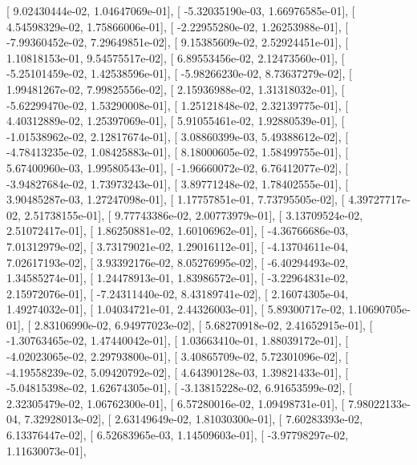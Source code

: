 \documentclass{article}
\begin{document}
       [  9.02430444e-02,   1.04647069e-01],
       [ -5.32035190e-03,   1.66976585e-01],
       [  4.54598329e-02,   1.75866006e-01],
       [ -2.22955280e-02,   1.26253988e-01],
       [ -7.99360452e-02,   7.29649851e-02],
       [  9.15385609e-02,   2.52924451e-01],
       [  1.10818153e-01,   9.54575517e-02],
       [  6.89553456e-02,   2.12473560e-01],
       [ -5.25101459e-02,   1.42538596e-01],
       [ -5.98266230e-02,   8.73637279e-02],
       [  1.99481267e-02,   7.99825556e-02],
       [  2.15936988e-02,   1.31318032e-01],
       [ -5.62299470e-02,   1.53290008e-01],
       [  1.25121848e-02,   2.32139775e-01],
       [  4.40312889e-02,   1.25397069e-01],
       [  5.91055461e-02,   1.92880539e-01],
       [ -1.01538962e-02,   2.12817674e-01],
       [  3.08860399e-03,   5.49388612e-02],
       [ -4.78413235e-02,   1.08425883e-01],
       [  8.18000605e-02,   1.58499755e-01],
       [  5.67400960e-03,   1.99580543e-01],
       [ -1.96660072e-02,   6.76412077e-02],
       [ -3.94827684e-02,   1.73973243e-01],
       [  3.89771248e-02,   1.78402555e-01],
       [  3.90485287e-03,   1.27247098e-01],
       [  1.17757851e-01,   7.73795505e-02],
       [  4.39727717e-02,   2.51738155e-01],
       [  9.77743386e-02,   2.00773979e-01],
       [  3.13709524e-02,   2.51072417e-01],
       [  1.86250881e-02,   1.60106962e-01],
       [ -4.36766686e-03,   7.01312979e-02],
       [  3.73179021e-02,   1.29016112e-01],
       [ -4.13704611e-04,   7.02617193e-02],
       [  3.93392176e-02,   8.05276995e-02],
       [ -6.40294493e-02,   1.34585274e-01],
       [  1.24478913e-01,   1.83986572e-01],
       [ -3.22964831e-02,   2.15972076e-01],
       [ -7.24311440e-02,   8.43189741e-02],
       [  2.16074305e-04,   1.49274032e-01],
       [  1.04034721e-01,   2.44326003e-01],
       [  5.89300717e-02,   1.10690705e-01],
       [  2.83106990e-02,   6.94977023e-02],
       [  5.68270918e-02,   2.41652915e-01],
       [ -1.30763465e-02,   1.47440042e-01],
       [  1.03663410e-01,   1.88039172e-01],
       [ -4.02023065e-02,   2.29793800e-01],
       [  3.40865709e-02,   5.72301096e-02],
       [ -4.19558239e-02,   5.09420792e-02],
       [  4.64390128e-03,   1.39821433e-01],
       [ -5.04815398e-02,   1.62674305e-01],
       [ -3.13815228e-02,   6.91653599e-02],
       [  2.32305479e-02,   1.06762300e-01],
       [  6.57280016e-02,   1.09498731e-01],
       [  7.98022133e-04,   7.32928013e-02],
       [  2.63149649e-02,   1.81030300e-01],
       [  7.60283393e-02,   6.13376447e-02],
       [  6.52683965e-03,   1.14509603e-01],
       [ -3.97798297e-02,   1.11630073e-01],
\end{document}
